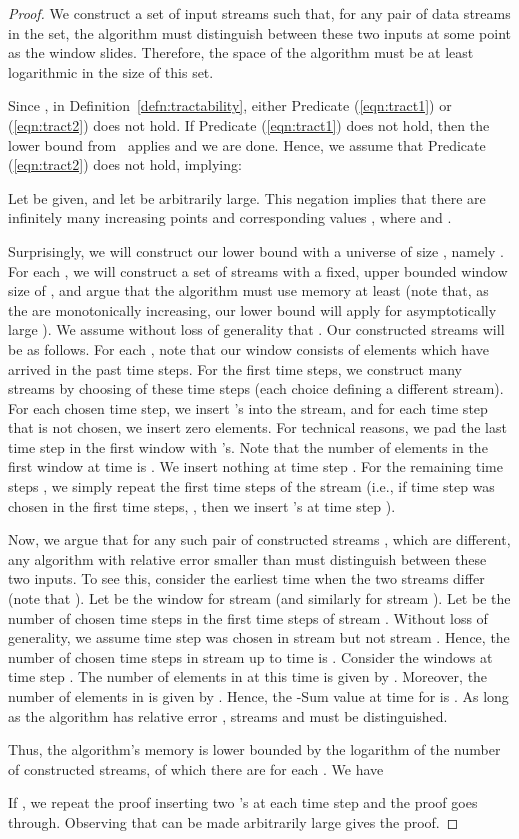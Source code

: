 \documentclass[11pt]{article}
\begin{document}
\begin{proof}
We construct a set of input streams such that, for any pair of data streams in the set, the algorithm must distinguish
between these two inputs at some point as the window slides.  Therefore, the space of the algorithm must be at least
logarithmic in the size of this set.

Since , in Definition~\ref{defn:tractability}, either
Predicate (\ref{eqn:tract1}) or (\ref{eqn:tract2}) does not hold.  If Predicate (\ref{eqn:tract1})
does not hold, then the lower bound from~\cite{BO10} applies and we are done.
Hence, we assume that
Predicate (\ref{eqn:tract2}) does not hold, implying:

Let  be given, and let  be arbitrarily large.  This negation implies that there are infinitely many
increasing points  and
corresponding values , where 
and .

Surprisingly, we will construct our lower bound with a universe of size , namely .  For each ,
we will construct a set of streams with a fixed, upper bounded window size of , and argue that the algorithm
must use memory at least  (note that, as the  are monotonically increasing, our lower bound will apply
for asymptotically large ).  We assume without loss of generality that
.  Our constructed streams will be as follows.
For each , note that our window
consists of elements which have arrived in the past  time steps.  For the first  time steps, we
construct many streams by choosing  of these time steps
(each choice defining a different stream).  For each chosen time step, we insert  's into
the stream, and for each time step that is not chosen, we insert zero elements.  For technical reasons, we pad
the last time step  in the first window with
 's.  Note that the
number of elements in the first window at time  is
.  We insert nothing at
time step .  For the remaining time steps , we simply repeat the first
 time steps of the stream (i.e., if time step  was chosen in the first  time steps,
, then we insert  's at time step ).

Now, we argue that for any such pair of constructed streams ,  which are different, any algorithm
with relative error smaller than  must distinguish between these two inputs.
To see this, consider the earliest time  when the two streams differ (note that ).
Let  be the window for stream  (and similarly  for stream ).
Let  be the number of chosen time steps in the first  time steps of stream .
Without loss of generality, we assume time step  was chosen in stream 
but not stream .  Hence, the number of chosen time steps in stream  up to time
 is .  Consider the windows at time step .  The number of elements in  at this time
is given by .  Moreover,
the number of elements in  is given by
.
Hence, the -Sum value at time  for  is .
As long as the algorithm has relative error , streams  and
 must be distinguished.

Thus, the algorithm's memory is lower bounded by the logarithm of the number of constructed streams, of which
there are  for each .  We have

If , we repeat the proof inserting two 's at each time step and the proof goes through.
Observing that  can be made arbitrarily large gives the proof.
\end{proof}
\end{document}
